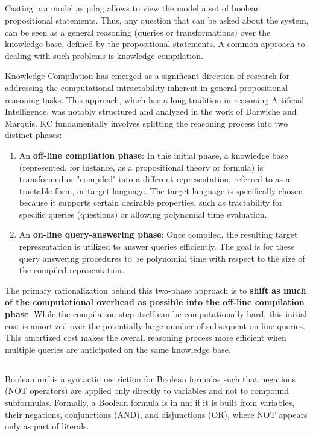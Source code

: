 \subsection{\color{blue}{Knowledge Compilation}}
Casting \acrshort{pra} model as \acrshort{pdag} allows to view the model a set of boolean propositional statements. Thus, any question that can be asked about the system, can be seen as a general reasoning (queries or transformations) over the knowledge base, defined by the propositional statements. A common approach to dealing with such problems is knowledge compilation.

Knowledge Compilation has emerged as a significant direction of research for addressing the computational intractability inherent in general propositional reasoning tasks. This approach, which has a long tradition in reasoning Artificial Intelligence, was notably structured and analyzed in the work of Darwiche and Marquis. KC fundamentally involves splitting the reasoning process into two distinct phases:
\begin{enumerate}
    \item An \textbf{off-line compilation phase}: In this initial phase, a knowledge base (represented, for instance, as a propositional theory or formula) is transformed or "compiled" into a different representation, referred to as a tractable form, or target language. The target language is specifically chosen because it supports certain desirable properties, such as tractability for specific queries (questions) or allowing polynomial time evaluation.
    \item An \textbf{on-line query-answering phase}: Once compiled, the resulting target representation is utilized to answer queries efficiently. The goal is for these query answering procedures to be polynomial time with respect to the size of the compiled representation.
\end{enumerate}
The primary rationalization behind this two-phase approach is to \textbf{shift as much of the computational overhead as possible into the off-line compilation phase}. While the compilation step itself can be computationally hard, this initial cost is amortized over the potentially large number of subsequent on-line queries. This amortized cost makes the overall reasoning process more efficient when multiple queries are anticipated on the same knowledge base.

\subsection{\color{blue}{Negation Normal Form (NNF)}}
Boolean \acrfull{nnf} is a syntactic restriction for Boolean formulas such that negations (NOT operators) are applied only directly to variables and not to compound subformulas. Formally, a Boolean formula is in \acrshort{nnf} if it is built from variables, their negations, conjunctions (AND), and disjunctions (OR), where NOT appears only as part of literals.

